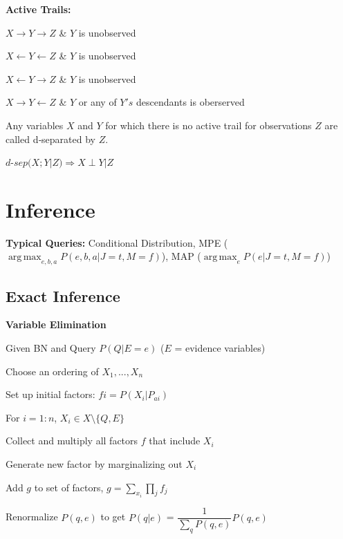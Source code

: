 \documentclass[a4paper, 11pt]{scrartcl}
\DeclareMathOperator*{\argmax}{arg\,max}
\begin{document}
\begin{multicols*}{3}
		\textbf{Active Trails:}
		\begin{compactitem}
			\item  $X \rightarrow  Y \rightarrow Z$ \& $Y$ is unobserved
			\item  $X \leftarrow  Y \leftarrow Z$ \& $Y$ is unobserved
			\item  $X \leftarrow  Y \rightarrow Z$ \& $Y$ is unobserved
			\item  $X \rightarrow  Y \leftarrow Z$ \& $Y$ or any of $Y's$ descendants is oberserved
		\end{compactitem}
	
		Any variables $X$ and $Y$ for which there is no active trail for observations $Z$ are called d‐separated by $Z$. 
		
		$d$-$sep(X;Y | Z) \Rightarrow X \perp Y | Z$
		
		\section{Inference}
		\textbf{Typical Queries:} Conditional Distribution, MPE ($\argmax_{e,b,a} P(e,b,a | J=t, M = f)$), MAP ($\argmax_{e} P(e | J=t, M = f)$)
		
		\subsection{Exact Inference}
		
		\textbf{Variable Elimination}
		
		\begin{compactitem}
			
		\item Given BN and Query $P(Q | E=e)$ ($E$ = evidence variables)
		\item Choose an ordering of $X_1, ..., X_n$
		\item Set up initial factors: $fi = P(X_i | P_{ai})$
		\item For $i =1:n$, $X_i  \in X\setminus \{Q,E\}$
		\begin{compactenum}
			\item Collect and multiply all factors $f$ that include $X_i$  
			\item Generate new factor by marginalizing out $X_i$
			\item Add $g$ to set of factors, $g = \sum_{x_i}\prod_{j}f_j$
		\end{compactenum}
		\item  Renormalize $P(q,e)$ to get $P(q | e)$ = $\dfrac{1}{\sum_{q}P(q,e)}P(q,e)$
		

\end{compactitem}
\end{multicols*}
\end{document}
